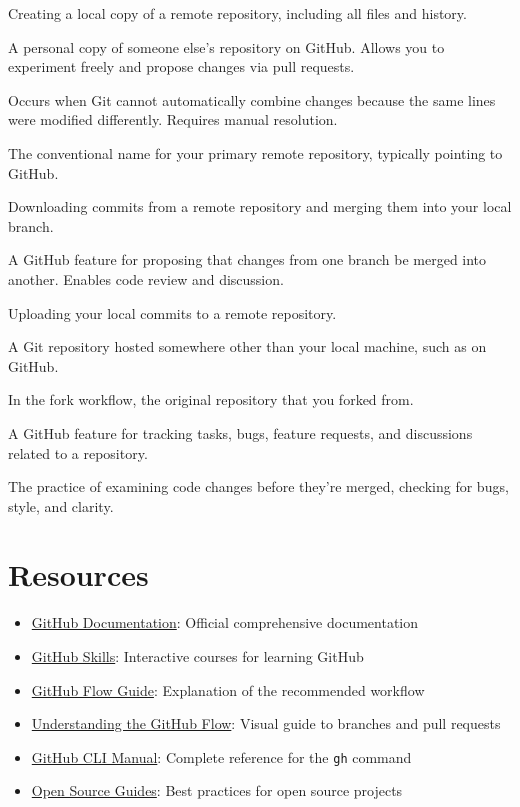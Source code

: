 \documentclass[
  letterpaper,
  DIV=11,
  numbers=noendperiod]{scrreprt}
\providecommand{\tightlist}{%
  \setlength{\itemsep}{0pt}\setlength{\parskip}{0pt}}
\begin{document}
\begin{description}
\tightlist
\item[\textbf{Clone}]
Creating a local copy of a remote repository, including all files and
history.
\item[\textbf{Fork}]
A personal copy of someone else's repository on GitHub. Allows you to
experiment freely and propose changes via pull requests.
\item[\textbf{Merge Conflict}]
Occurs when Git cannot automatically combine changes because the same
lines were modified differently. Requires manual resolution.
\item[\textbf{Origin}]
The conventional name for your primary remote repository, typically
pointing to GitHub.
\item[\textbf{Pull}]
Downloading commits from a remote repository and merging them into your
local branch.
\item[\textbf{Pull Request (PR)}]
A GitHub feature for proposing that changes from one branch be merged
into another. Enables code review and discussion.
\item[\textbf{Push}]
Uploading your local commits to a remote repository.
\item[\textbf{Remote}]
A Git repository hosted somewhere other than your local machine, such as
on GitHub.
\item[\textbf{Upstream}]
In the fork workflow, the original repository that you forked from.
\item[\textbf{Issue}]
A GitHub feature for tracking tasks, bugs, feature requests, and
discussions related to a repository.
\item[\textbf{Code Review}]
The practice of examining code changes before they're merged, checking
for bugs, style, and clarity.
\end{description}

\section{Resources}\label{resources-1}

\begin{itemize}
\tightlist
\item
  \href{https://docs.github.com/}{GitHub Documentation}: Official
  comprehensive documentation
\item
  \href{https://skills.github.com/}{GitHub Skills}: Interactive courses
  for learning GitHub
\item
  \href{https://docs.github.com/en/get-started/using-github/github-flow}{GitHub
  Flow Guide}: Explanation of the recommended workflow
\item
  \href{https://guides.github.com/introduction/flow/}{Understanding the
  GitHub Flow}: Visual guide to branches and pull requests
\item
  \href{https://cli.github.com/manual/}{GitHub CLI Manual}: Complete
  reference for the \texttt{gh} command
\item
  \href{https://opensource.guide/}{Open Source Guides}: Best practices
  for open source projects
\end{itemize}
\end{document}
